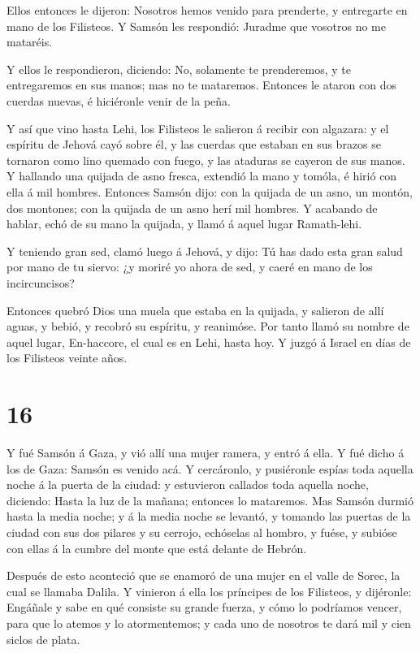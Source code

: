  Ellos entonces le dijeron: Nosotros hemos venido para
prenderte, y entregarte en mano de los Filisteos. Y Samsón les
respondió: Juradme que vosotros no me mataréis.

 Y ellos le respondieron, diciendo: No, solamente te
prenderemos, y te entregaremos en sus manos; mas no te mataremos.
Entonces le ataron con dos cuerdas nuevas, é hiciéronle venir de la
peña.

 Y así que vino hasta Lehi, los Filisteos le salieron á
recibir con algazara: y el espíritu de Jehová cayó sobre él, y las
cuerdas que estaban en sus brazos se tornaron como lino quemado con
fuego, y las ataduras se cayeron de sus manos.  Y hallando
una quijada de asno fresca, extendió la mano y tomóla, é hirió con ella
á mil hombres.  Entonces Samsón dijo: con la quijada de un
asno, un montón, dos montones; con la quijada de un asno herí mil
hombres.  Y acabando de hablar, echó de su mano la quijada,
y llamó á aquel lugar Ramath-lehi.

 Y teniendo gran sed, clamó luego á Jehová, y dijo: Tú has
dado esta gran salud por mano de tu siervo: ¿y moriré yo ahora de sed, y
caeré en mano de los incircuncisos?

 Entonces quebró Dios una muela que estaba en la quijada, y
salieron de allí aguas, y bebió, y recobró su espíritu, y reanimóse. Por
tanto llamó su nombre de aquel lugar, En-haccore, el cual es en Lehi,
hasta hoy.  Y juzgó á Israel en días de los Filisteos
veinte años.

\hypertarget{section-15}{%
\section{16}\label{section-15}}

 Y fué Samsón á Gaza, y vió allí una mujer ramera, y entró á
ella.  Y fué dicho á los de Gaza: Samsón es venido acá. Y
cercáronlo, y pusiéronle espías toda aquella noche á la puerta de la
ciudad: y estuvieron callados toda aquella noche, diciendo: Hasta la luz
de la mañana; entonces lo mataremos.  Mas Samsón durmió
hasta la media noche; y á la media noche se levantó, y tomando las
puertas de la ciudad con sus dos pilares y su cerrojo, echóselas al
hombro, y fuése, y subióse con ellas á la cumbre del monte que está
delante de Hebrón.

 Después de esto aconteció que se enamoró de una mujer en el
valle de Sorec, la cual se llamaba Dalila.  Y vinieron á
ella los príncipes de los Filisteos, y dijéronle: Engáñale y sabe en qué
consiste su grande fuerza, y cómo lo podríamos vencer, para que lo
atemos y lo atormentemos; y cada uno de nosotros te dará mil y cien
siclos de plata.

